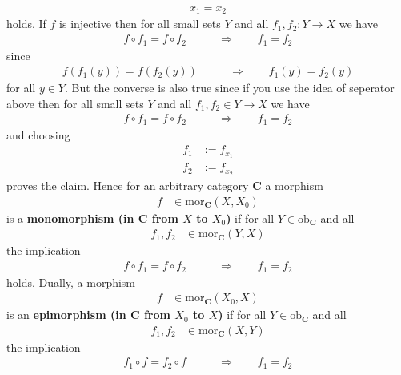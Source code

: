 \begin{exa}
\begin{enumerate}
\begin{align*}
  x_{1}
  =
  x_{2}
\end{align*}
holds. If $f$ is injective then for all small sets $Y$ and all $f_{1},f_{2} \colon Y \rightarrow X$ we have
\begin{align*}
  f
  \circ
  f_{1}
  =
  f
  \circ
  f_{2}
  \qquad
  &\Rightarrow
  \qquad
  f_{1}
  =
  f_{2}
\end{align*}
since
\begin{align*}
  f
  \left(
    f_{1}(y)
  \right)
  =
  f
  \left(
    f_{2}(y)
  \right)
  \qquad
  &\Rightarrow
  \qquad
  f_{1}(y)
  =
  f_{2}(y)
\end{align*}
for all $y \in Y$. But the converse is also true since if you use the idea of seperator above then for all small sets $Y$ and all $f_{1},f_{2} \in Y \rightarrow X$ we have
\begin{align*}
  f
  \circ
  f_{1}
  =
  f
  \circ
  f_{2}
  \qquad
  &\Rightarrow
  \qquad
  f_{1}
  =
  f_{2}
\end{align*}
and choosing
\begin{align*}
  f_{1}
  &:=
  f_{x_{1}}
  \\
  f_{2}
  &:=
  f_{x_{2}}
\end{align*}
proves the claim. Hence for an arbitrary category $\mathbf{C}$ a morphism
\begin{align*}
  f
  &\in
  \mathrm{mor}_{\mathbf{C}}(X,X_{0})
\end{align*}
is a \textbf{monomorphism (in $\mathbf{C}$ from $X$ to $X_{0}$)} if for all $Y \in \mathrm{ob}_{\mathbf{C}}$ and all
\begin{align*}
  f_{1},
  f_{2}
  &\in
  \mathrm{mor}_{\mathbf{C}}(Y,X)
\end{align*}
the implication
\begin{align*}
  f
  \circ
  f_{1}
  =
  f
  \circ
  f_{2}
  \qquad
  &\Rightarrow
  \qquad
  f_{1}
  =
  f_{2}
\end{align*}
holds. Dually, a morphism
\begin{align*}
  f
  &\in
  \mathrm{mor}_{\mathbf{C}}(X_{0},X)
\end{align*}
is an \textbf{epimorphism (in $\mathbf{C}$ from $X_{0}$ to $X$)} if for all $Y \in \mathrm{ob}_{\mathbf{C}}$ and all
\begin{align*}
  f_{1},
  f_{2}
  &\in
  \mathrm{mor}_{\mathbf{C}}(X,Y)
\end{align*}
the implication
\begin{align*}
  f_{1}
  \circ
  f
  =
  f_{2}
  \circ
  f
  \qquad
  &\Rightarrow
  \qquad
  f_{1}
  =
  f_{2}
\end{align*}

\end{enumerate}
\end{exa}
